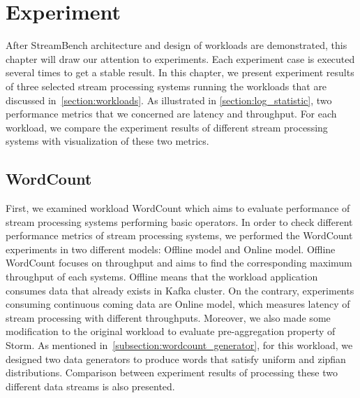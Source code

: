 \chapter{Experiment}
\label{chapter:experiment}

After StreamBench architecture and design of workloads are demonstrated, this chapter will draw our attention to experiments. Each experiment case is executed several times to get a stable result. In this chapter, we present experiment results of three selected stream processing systems running the workloads that are discussed in~\cref{section:workloads}. As illustrated in \cref{section:log_statistic}, two performance metrics that we concerned are latency and throughput. For each workload, we compare the experiment results of different stream processing systems with visualization of these two metrics. 

\section{WordCount}
\label{section:wordcount_experiment}

First, we examined workload WordCount which aims to evaluate performance of stream processing systems performing basic operators. In order to check different performance metrics of stream processing systems, we performed the WordCount experiments in two different models: Offline model and Online model. Offline WordCount focuses on throughput and aims to find the corresponding maximum throughput of each systems. Offline means that the workload application consumes data that already exists in Kafka cluster. On the contrary, experiments consuming continuous coming data are Online model, which measures latency of stream processing with different throughputs. Moreover, we also made some modification to the original workload to evaluate pre-aggregation property of Storm.  As mentioned in~\cref{subsection:wordcount_generator}, for this workload, we designed two data generators to produce words that satisfy uniform and zipfian distributions. Comparison between experiment results of processing these two different data streams is also presented. 


